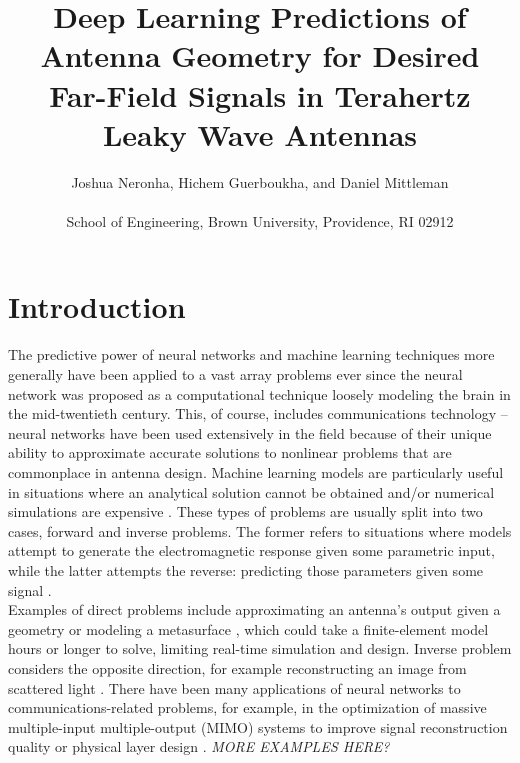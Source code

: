 \documentclass[11pt]{article}
\begin{document}
\title{Deep Learning Predictions of Antenna Geometry for Desired Far-Field Signals in Terahertz Leaky Wave Antennas}
\author{Joshua Neronha, Hichem Guerboukha, and Daniel Mittleman \\ \\ \small School of Engineering, Brown University, Providence, RI 02912}
\date{}

\maketitle

\section*{Introduction}

The predictive power of neural networks and machine learning techniques more generally have been applied to a vast array problems ever since the neural network was proposed as a computational technique loosely modeling the brain in the mid-twentieth century. \cite{McCulloch:1943vq} This, of course, includes communications technology -- neural networks have been used extensively in the field because of their unique ability to approximate accurate solutions to nonlinear problems that are commonplace in antenna design. Machine learning models are particularly useful in situations where an analytical solution cannot be obtained and/or numerical simulations are expensive \cite{Kim, Massa}. These types of problems are usually split into two cases, forward and inverse problems. The former refers to situations where models attempt to generate the electromagnetic response given some parametric input, while the latter attempts the reverse: predicting those parameters given some signal \cite{9395365}. \\

\noindent Examples of direct problems include approximating an antenna's output given a geometry \cite{8608745} or modeling a metasurface \cite{Nadell:19}, which could take a finite-element model hours or longer to solve, limiting real-time simulation and design. Inverse problem considers the opposite direction, for example reconstructing an image from scattered light \cite{Sun:18}. There have been many applications of neural networks to communications-related problems, for example, in the optimization of massive multiple-input multiple-output (MIMO) systems to improve signal reconstruction quality \cite{8322184} or physical layer design \cite{DBLP:journals/corr/OSheaEC17}. \emph{MORE EXAMPLES HERE?} \\
\end{document}
